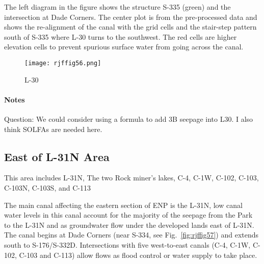 The left diagram in the figure shows the structure S-335 (green) and the intersection at Dade Corners. The center plot is from the pre-processed data and shows the re-alignment of the canal with the grid cells and the stair-step pattern south of S-335 where L-30 turns to the southwest. The red cells are higher elevation cells to prevent spurious surface water from going across the canal.

\begin{figure}[!h]
  \begin{center}
  \texttt{[image: rjffig56.png]}
  \caption{L-30}
  \label{fig:rjffig56}
  \end{center}
\end{figure}

\begin{notes}
\paragraph{Notes}
Question: We could consider using a formula to add 3B seepage into L30.
I also think SOLFAs are needed here.
\end{notes}

\clearpage



\subsection{East of L-31N Area}
This area includes L-31N, The two Rock miner's lakes, C-4, C-1W, C-102, C-103, C-103N, C-103S, and C-113

The main canal affecting the eastern section of ENP is the L-31N, low canal water levels in this canal account for the majority of the seepage from the Park to the L-31N and as groundwater flow under the developed lands east of L-31N. The canal begins at Dade Corners (near S-334, see Fig.~\ref{fig:rjffig57}) and extends south to S-176/S-332D. Intersections with five west-to-east canals (C-4, C-1W, C-102, C-103 and C-113) allow flows as flood control or water supply to take place.


\clearpage
